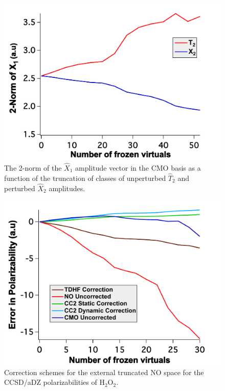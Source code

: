 \begin{figure}
  \centering
  \includegraphics[width=0.6\linewidth]{figures/norm.pdf}
  \caption{\footnotesize{The 2-norm of the $\hat{X}_1$ amplitude vector in
the CMO basis as a function of the truncation of classes of unperturbed 
$\hat{T}_2$ and perturbed $\hat{X}_2$ amplitudes.}}
   \label{fig:norm}
\end{figure}
\begin{figure}
  \centering
  \includegraphics[width=0.6\linewidth]{figures/correctn.pdf}
  \caption{\footnotesize{Correction schemes for the external truncated
NO space for the CCSD/aDZ polarizabilities of H$_2$O$_2$.}}
   \label{fig:corrections}
\end{figure}

